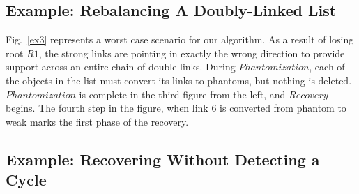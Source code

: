 

\subsection{Example: Rebalancing A Doubly-Linked List}

Fig.~\ref{ex3} represents a worst case scenario for our algorithm. As a
result of losing root $R1$, the
strong links are pointing in exactly the wrong direction to provide
support across
an entire chain of double links. During $Phantomization$, each
of the objects in the list must convert its links to phantoms,
but nothing is deleted. $Phantomization$ is complete in the third
figure from the left, and $Recovery$ begins.
The fourth step in the figure, when link 6 is converted from phantom to weak
marks the first phase of the recovery.



\subsection{Example: Recovering Without Detecting a Cycle}

